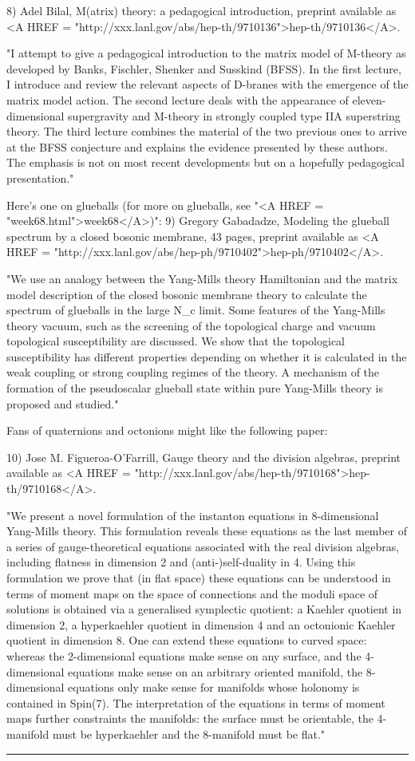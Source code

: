 8) Adel Bilal, M(atrix) theory: a pedagogical introduction, 
preprint available as <A HREF = "http://xxx.lanl.gov/abs/hep-th/9710136">hep-th/9710136</A>.

"I attempt to give a pedagogical introduction to the matrix model of
M-theory as developed by Banks, Fischler, Shenker and Susskind
(BFSS). In the first lecture, I introduce and review the relevant
aspects of D-branes with the emergence of the matrix model action. The
second lecture deals with the appearance of eleven-dimensional
supergravity and M-theory in strongly coupled type IIA superstring
theory. The third lecture combines the material of the two previous ones
to arrive at the BFSS conjecture and explains the evidence presented by
these authors. The emphasis is not on most recent developments but on a
hopefully pedagogical presentation."

Here's one on glueballs (for more on glueballs, see "<A HREF =
"week68.html">week68</A>)": 
9) Gregory Gabadadze, Modeling the glueball spectrum by a closed bosonic
membrane, 43 pages, preprint available as
<A HREF = "http://xxx.lanl.gov/abs/hep-ph/9710402">hep-ph/9710402</A>.

"We use an analogy between the Yang-Mills theory Hamiltonian and the
matrix model description of the closed bosonic membrane theory to
calculate the spectrum of glueballs in the large N_c limit. Some
features of the Yang-Mills theory vacuum, such as the screening of the
topological charge and vacuum topological susceptibility are
discussed. We show that the topological susceptibility has different
properties depending on whether it is calculated in the weak coupling or
strong coupling regimes of the theory. A mechanism of the formation of
the pseudoscalar glueball state within pure Yang-Mills theory is
proposed and studied."

Fans of quaternions and octonions might like the following paper:

10) Jose M. Figueroa-O'Farrill, Gauge theory and the division algebras, 
preprint available as <A HREF = "http://xxx.lanl.gov/abs/hep-th/9710168">hep-th/9710168</A>.  

"We present a novel formulation of the instanton equations in
8-dimensional Yang-Mills theory. This formulation reveals these
equations as the last member of a series of gauge-theoretical equations
associated with the real division algebras, including flatness in
dimension 2 and (anti-)self-duality in 4. Using this formulation we
prove that (in flat space) these equations can be understood in terms of
moment maps on the space of connections and the moduli space of
solutions is obtained via a generalised symplectic quotient: a Kaehler
quotient in dimension 2, a hyperkaehler quotient in dimension 4 and an
octonionic Kaehler quotient in dimension 8. One can extend these
equations to curved space: whereas the 2-dimensional equations make
sense on any surface, and the 4-dimensional equations make sense on an
arbitrary oriented manifold, the 8-dimensional equations only make sense
for manifolds whose holonomy is contained in Spin(7). The interpretation
of the equations in terms of moment maps further constraints the
manifolds: the surface must be orientable, the 4-manifold must be
hyperkaehler and the 8-manifold must be flat."


 \par\noindent\rule{\textwidth}{0.4pt}

